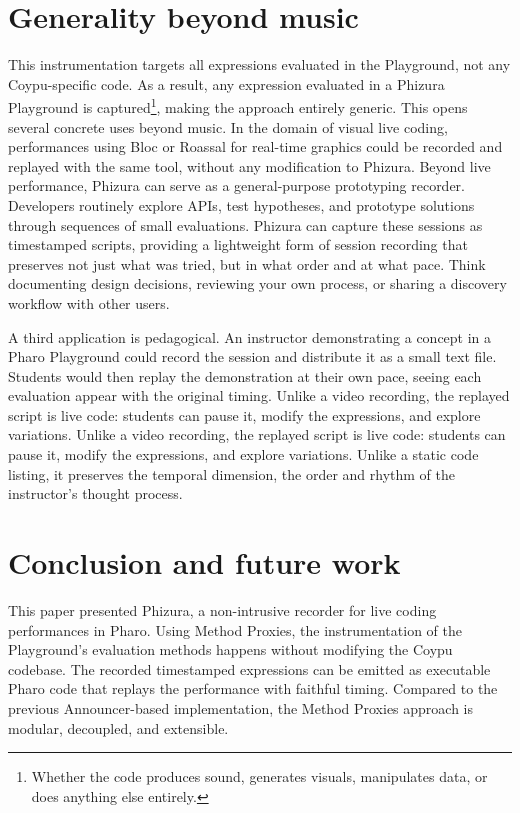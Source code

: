\documentclass[
]{ceurart}
\begin{document}
\section{Generality beyond music}
This instrumentation targets all expressions evaluated in the Playground, not any Coypu-specific code. As a result, any expression evaluated in a Phizura Playground is captured\footnote{Whether the code produces sound, generates visuals, manipulates data, or does anything else entirely.}, making the approach entirely generic.
This opens several concrete uses beyond music. In the domain of visual live coding, performances using Bloc or Roassal for real-time graphics could be recorded and replayed with the same tool, without any modification to Phizura.
Beyond live performance, Phizura can serve as a general-purpose prototyping recorder. Developers routinely explore APIs, test hypotheses, and prototype solutions through sequences of small evaluations. Phizura can capture these sessions as timestamped scripts, providing a lightweight form of session recording that preserves not just what was tried, but in what order and at what pace. Think documenting design decisions, reviewing your own process, or sharing a discovery workflow with other users.

A third application is pedagogical. An instructor demonstrating a concept in a Pharo Playground could record the session and distribute it as a small text file. Students would then replay the demonstration at their own pace, seeing each evaluation appear with the original timing. Unlike a video recording, the replayed script is live code: students can pause it, modify the expressions, and explore variations. Unlike a video recording, the replayed script is live code: students can pause it, modify the expressions, and explore variations. Unlike a static code listing, it preserves the temporal dimension, the order and rhythm of the instructor's thought process.%


\section{Conclusion and future work}

This paper presented Phizura, a non-intrusive recorder for live coding performances in Pharo. Using Method Proxies, the instrumentation of the Playground's evaluation methods happens without modifying the Coypu codebase. The recorded timestamped expressions can be emitted as executable Pharo code that replays the performance with faithful timing. Compared to the previous Announcer-based implementation, the Method Proxies approach is modular, decoupled, and extensible.
\end{document}
